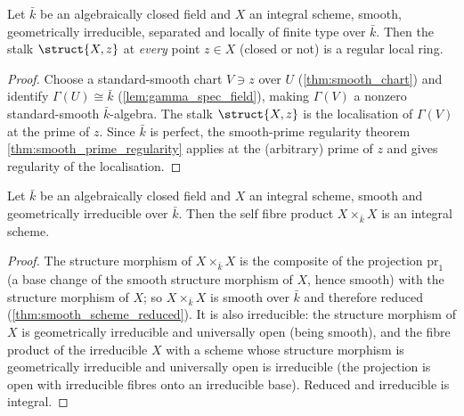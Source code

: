 \begin{theorem}
  \label{thm:smooth_stalk_regular}
  \leanok
  Let \(\bar k\) be an algebraically closed field and \(X\) an integral scheme,
  smooth, geometrically irreducible, separated and locally of finite type over
  \(\bar k\). Then the stalk \(\struct{X,z}\) at \emph{every} point \(z \in X\)
  (closed or not) is a regular local ring.
\end{theorem}
\begin{proof}
  \leanok
  Choose a standard-smooth chart \(V \ni z\) over \(U\)
  (\ref{thm:smooth_chart}) and identify \(\Gamma(U) \cong \bar k\)
  (\ref{lem:gamma_spec_field}), making \(\Gamma(V)\) a nonzero standard-smooth
  \(\bar k\)-algebra. The stalk \(\struct{X,z}\) is the localisation of
  \(\Gamma(V)\) at the prime of \(z\). Since \(\bar k\) is perfect, the
  smooth-prime regularity theorem \ref{thm:smooth_prime_regularity} applies at
  the (arbitrary) prime of \(z\) and gives regularity of the localisation.
\end{proof}

\begin{theorem}
  \label{thm:self_product_integral}
  \leanok
  Let \(\bar k\) be an algebraically closed field and \(X\) an integral scheme,
  smooth and geometrically irreducible over \(\bar k\). Then the self fibre
  product \(X \times_{\bar k} X\) is an integral scheme.
\end{theorem}
\begin{proof}
  \leanok
  The structure morphism of \(X \times_{\bar k} X\) is the composite of the
  projection \(\mathrm{pr}_1\) (a base change of the smooth structure morphism
  of \(X\), hence smooth) with the structure morphism of \(X\); so
  \(X \times_{\bar k} X\) is smooth over \(\bar k\) and therefore reduced
  (\ref{thm:smooth_scheme_reduced}). It is also irreducible: the structure
  morphism of \(X\) is geometrically irreducible and universally open (being
  smooth), and the fibre product of the irreducible \(X\) with a scheme whose
  structure morphism is geometrically irreducible and universally open is
  irreducible (the projection is open with irreducible fibres onto an
  irreducible base). Reduced and irreducible is integral.
\end{proof}

